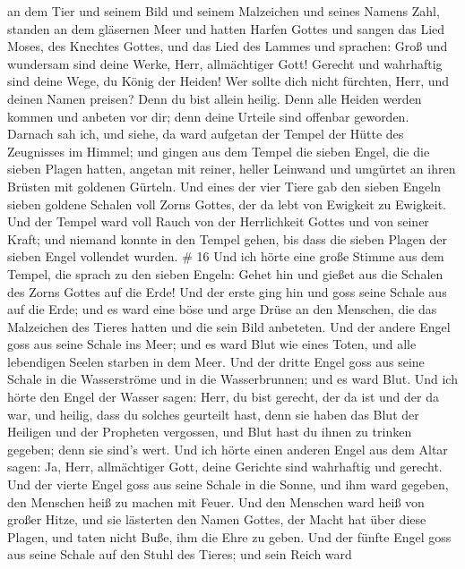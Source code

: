an dem Tier und seinem Bild und seinem Malzeichen und seines Namens
Zahl, standen an dem gläsernen Meer und hatten Harfen Gottes
 und sangen das Lied Moses, des Knechtes Gottes, und das
Lied des Lammes und sprachen: Groß und wundersam sind deine Werke, Herr,
allmächtiger Gott! Gerecht und wahrhaftig sind deine Wege, du König der
Heiden!  Wer sollte dich nicht fürchten, Herr, und deinen
Namen preisen? Denn du bist allein heilig. Denn alle Heiden werden
kommen und anbeten vor dir; denn deine Urteile sind offenbar geworden.
 Darnach sah ich, und siehe, da ward aufgetan der Tempel der
Hütte des Zeugnisses im Himmel;  und gingen aus dem Tempel
die sieben Engel, die die sieben Plagen hatten, angetan mit reiner,
heller Leinwand und umgürtet an ihren Brüsten mit goldenen Gürteln.
 Und eines der vier Tiere gab den sieben Engeln sieben
goldene Schalen voll Zorns Gottes, der da lebt von Ewigkeit zu Ewigkeit.
 Und der Tempel ward voll Rauch von der Herrlichkeit Gottes
und von seiner Kraft; und niemand konnte in den Tempel gehen, bis dass
die sieben Plagen der sieben Engel vollendet wurden. \# 16 
Und ich hörte eine große Stimme aus dem Tempel, die sprach zu den sieben
Engeln: Gehet hin und gießet aus die Schalen des Zorns Gottes auf die
Erde!  Und der erste ging hin und goss seine Schale aus auf
die Erde; und es ward eine böse und arge Drüse an den Menschen, die das
Malzeichen des Tieres hatten und die sein Bild anbeteten. 
Und der andere Engel goss aus seine Schale ins Meer; und es ward Blut
wie eines Toten, und alle lebendigen Seelen starben in dem Meer.
 Und der dritte Engel goss aus seine Schale in die
Wasserströme und in die Wasserbrunnen; und es ward Blut. 
Und ich hörte den Engel der Wasser sagen: Herr, du bist gerecht, der da
ist und der da war, und heilig, dass du solches geurteilt hast,
 denn sie haben das Blut der Heiligen und der Propheten
vergossen, und Blut hast du ihnen zu trinken gegeben; denn sie sind's
wert.  Und ich hörte einen anderen Engel aus dem Altar
sagen: Ja, Herr, allmächtiger Gott, deine Gerichte sind wahrhaftig und
gerecht.  Und der vierte Engel goss aus seine Schale in die
Sonne, und ihm ward gegeben, den Menschen heiß zu machen mit Feuer.
 Und den Menschen ward heiß von großer Hitze, und sie
lästerten den Namen Gottes, der Macht hat über diese Plagen, und taten
nicht Buße, ihm die Ehre zu geben.  Und der fünfte Engel
goss aus seine Schale auf den Stuhl des Tieres; und sein Reich ward
